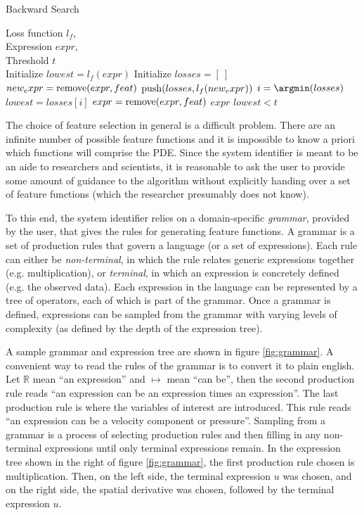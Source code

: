 \documentclass{article}
\begin{document}
\begin{algorithm}[tb]
   \caption{Backward Search}
   \label{alg:bs}
\begin{algorithmic}
    Loss function $l_f$, \\
   \quad \quad \quad Expression $expr$, \\
   \quad \quad \quad Threshold $t$ \\
   \STATE Initialize $lowest = l_f(expr)$
   \REPEAT
   \STATE Initialize $losses = [ \ ]$
   \STATE $new_expr = {\rm remove}(expr, feat)$
   \STATE ${\rm push}(losses, l_f(new_expr))$
   \ENDFOR
   \STATE $i = \argmin(losses)$
   \STATE $lowest = losses[i]$
   \STATE $expr = {\rm remove}(expr, feat)$
   \ELSE
    $expr$
   \ENDIF
   \UNTIL $lowest < t$
\end{algorithmic}
\end{algorithm}


The choice of feature selection in general is a difficult problem. There are an infinite number of possible feature functions and it is impossible to know a priori which functions will comprise the PDE. Since the system identifier is meant to be an aide to researchers and scientists, it is reasonable to ask the user to provide some amount of guidance to the algorithm without explicitly handing over a set of feature functions (which the researcher presumably does not know).

To this end, the system identifier relies on a domain-specific \textit{grammar}, provided by the user, that gives the rules for generating feature functions. A grammar is a set of production rules that govern a language (or a set of expressions). Each rule can either be \textit{non-terminal}, in which the rule relates generic expressions together (e.g. multiplication), or \textit{terminal}, in which an expression is concretely defined (e.g. the observed data). Each expression in the language can be represented by a tree of operators, each of which is part of the grammar. Once a grammar is defined, expressions can be sampled from the grammar with varying levels of complexity (as defined by the depth of the expression tree).

A sample grammar and expression tree are shown in figure \ref{fig:grammar}. A convenient way to read the rules of the grammar is to convert it to plain english. Let $\mathbb{R}$ mean ``an expression'' and $\mapsto$ mean ``can be'', then the second production rule reads ``an expression can be an expression times an expression''. The last production rule is where the variables of interest are introduced. This rule reads ``an expression can be a velocity component or pressure''. Sampling from a grammar is a process of selecting production rules and then filling in any non-terminal expressions until only terminal expressions remain. In the expression tree shown in the right of figure \ref{fig:grammar}, the first production rule chosen is multiplication. Then, on the left side, the terminal expression $u$ was chosen, and on the right side, the spatial derivative was chosen, followed by the terminal expression $u$.
\end{document}
